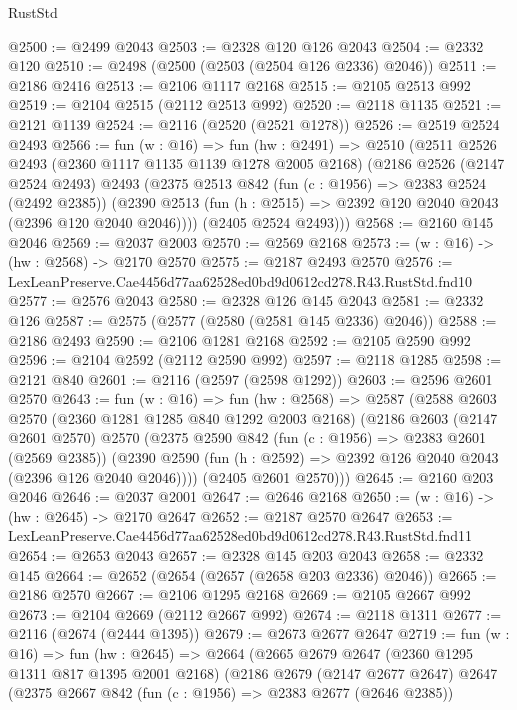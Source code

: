 \begin{lexlean}{RustStd}
\begin{coremodule}
@2500 := @2499 @2043
@2503 := @2328 @120 @126 @2043
@2504 := @2332 @120
@2510 := @2498 (@2500 (@2503 (@2504 @126 @2336) @2046))
@2511 := @2186 @2416
@2513 := @2106 @1117 @2168
@2515 := @2105 @2513 @992
@2519 := @2104 @2515 (@2112 @2513 @992)
@2520 := @2118 @1135
@2521 := @2121 @1139
@2524 := @2116 (@2520 (@2521 @1278))
@2526 := @2519 @2524 @2493
@2566 := fun (w : @16) =>
  fun (hw : @2491) =>
  @2510
    (@2511
      @2526
      @2493
      (@2360 @1117 @1135 @1139 @1278 @2005 @2168)
      (@2186
        @2526
        (@2147 @2524 @2493)
        @2493
        (@2375
          @2513
          @842
          (fun (c : @1956) => @2383 @2524 (@2492 @2385))
          (@2390 @2513 (fun (h : @2515) => @2392 @120 @2040 @2043 (@2396 @120 @2040 @2046))))
        (@2405 @2524 @2493)))
@2568 := @2160 @145 @2046
@2569 := @2037 @2003
@2570 := @2569 @2168
@2573 := (w : @16) -> (hw : @2568) -> @2170 @2570
@2575 := @2187 @2493 @2570
@2576 := LexLeanPreserve.Cae4456d77aa62528ed0bd9d0612cd278.R43.RustStd.fnd10
@2577 := @2576 @2043
@2580 := @2328 @126 @145 @2043
@2581 := @2332 @126
@2587 := @2575 (@2577 (@2580 (@2581 @145 @2336) @2046))
@2588 := @2186 @2493
@2590 := @2106 @1281 @2168
@2592 := @2105 @2590 @992
@2596 := @2104 @2592 (@2112 @2590 @992)
@2597 := @2118 @1285
@2598 := @2121 @840
@2601 := @2116 (@2597 (@2598 @1292))
@2603 := @2596 @2601 @2570
@2643 := fun (w : @16) =>
  fun (hw : @2568) =>
  @2587
    (@2588
      @2603
      @2570
      (@2360 @1281 @1285 @840 @1292 @2003 @2168)
      (@2186
        @2603
        (@2147 @2601 @2570)
        @2570
        (@2375
          @2590
          @842
          (fun (c : @1956) => @2383 @2601 (@2569 @2385))
          (@2390 @2590 (fun (h : @2592) => @2392 @126 @2040 @2043 (@2396 @126 @2040 @2046))))
        (@2405 @2601 @2570)))
@2645 := @2160 @203 @2046
@2646 := @2037 @2001
@2647 := @2646 @2168
@2650 := (w : @16) -> (hw : @2645) -> @2170 @2647
@2652 := @2187 @2570 @2647
@2653 := LexLeanPreserve.Cae4456d77aa62528ed0bd9d0612cd278.R43.RustStd.fnd11
@2654 := @2653 @2043
@2657 := @2328 @145 @203 @2043
@2658 := @2332 @145
@2664 := @2652 (@2654 (@2657 (@2658 @203 @2336) @2046))
@2665 := @2186 @2570
@2667 := @2106 @1295 @2168
@2669 := @2105 @2667 @992
@2673 := @2104 @2669 (@2112 @2667 @992)
@2674 := @2118 @1311
@2677 := @2116 (@2674 (@2444 @1395))
@2679 := @2673 @2677 @2647
@2719 := fun (w : @16) =>
  fun (hw : @2645) =>
  @2664
    (@2665
      @2679
      @2647
      (@2360 @1295 @1311 @817 @1395 @2001 @2168)
      (@2186
        @2679
        (@2147 @2677 @2647)
        @2647
        (@2375
          @2667
          @842
          (fun (c : @1956) => @2383 @2677 (@2646 @2385))

\end{coremodule}
\end{lexlean}

